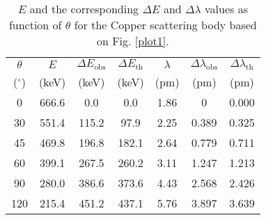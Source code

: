 \begin{table}[H]
    \centering
    \begin{tabular}{|c|c|c|c|c|c|c|}
    \hline
    $\theta$ & $E$ & $\Delta E_\text{obs}$ & $\Delta E_\text{th}$ & $\lambda$ & $\Delta \lambda_\text{obs}$ & $\Delta \lambda_\text{th}$ \\
    ($^\circ$) & (keV) & (keV) & (keV) & (pm) & (pm) & (pm) \\ \hline
    0 & 666.6 & 0.0 & 0.0 & 1.86 & 0 & 0.000 \\ \hline
    30 & 551.4 & 115.2 & 97.9 & 2.25 & 0.389 & 0.325 \\ \hline
    45 & 469.8 & 196.8 & 182.1 & 2.64 & 0.779 & 0.711 \\ \hline
    60 & 399.1 & 267.5 & 260.2 & 3.11 & 1.247 & 1.213 \\ \hline
    90 & 280.0 & 386.6 & 373.6 & 4.43 & 2.568 & 2.426 \\ \hline
    120 & 215.4 & 451.2 & 437.1 & 5.76 & 3.897 & 3.639 \\ \hline
    \end{tabular}
    \caption{$E$ and the corresponding $\Delta E$ and $\Delta \lambda$ values as function of $\theta$ for the Copper scattering body based on Fig. \ref{plot1}.}
    \label{tab:2}
\end{table}